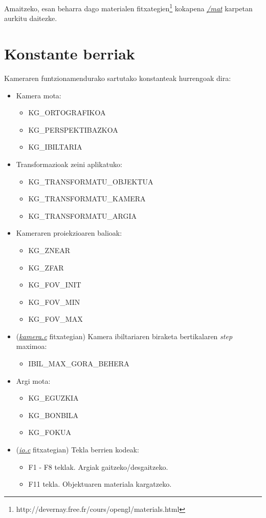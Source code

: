 \documentclass[12pt]{article}
\newcommand{\fitxategi}[1] {\underline{\textit{#1}}}
\begin{document}
Amaitzeko, esan beharra dago materialen fitxategien\footnote{http://devernay.free.fr/cours/opengl/materials.html} kokapena \fitxategi{/mat} karpetan aurkitu daitezke.

\section{Konstante berriak}\label{constants}

Kameraren funtzionamendurako sartutako konstanteak hurrengoak dira:

\begin{itemize}
\item Kamera mota:
\begin{itemize}
\item KG\_ORTOGRAFIKOA
\item KG\_PERSPEKTIBAZKOA
\item KG\_IBILTARIA
\end{itemize}

\item Transformazioak zeini aplikatuko:
\begin{itemize}
\item KG\_TRANSFORMATU\_OBJEKTUA
\item KG\_TRANSFORMATU\_KAMERA
\item KG\_TRANSFORMATU\_ARGIA
\end{itemize}

\item Kameraren proiekzioaren balioak:
\begin{itemize}
\item KG\_ZNEAR
\item KG\_ZFAR
\item KG\_FOV\_INIT
\item KG\_FOV\_MIN
\item KG\_FOV\_MAX
\end{itemize}

\item (\fitxategi{kamera.c} fitxategian) Kamera ibiltariaren biraketa bertikalaren \textit{step} maximoa:
\begin{itemize}
\item IBIL\_MAX\_GORA\_BEHERA
\end{itemize}

\item Argi mota:
\begin{itemize}
\item KG\_EGUZKIA
\item KG\_BONBILA
\item KG\_FOKUA
\end{itemize}

\item (\fitxategi{io.c} fitxategian) Tekla berrien kodeak:
\begin{itemize}
\item F1 - F8 teklak. Argiak gaitzeko/desgaitzeko.
\item F11 tekla. Objektuaren materiala kargatzeko.
\end{itemize}

\end{itemize}
\end{document}
